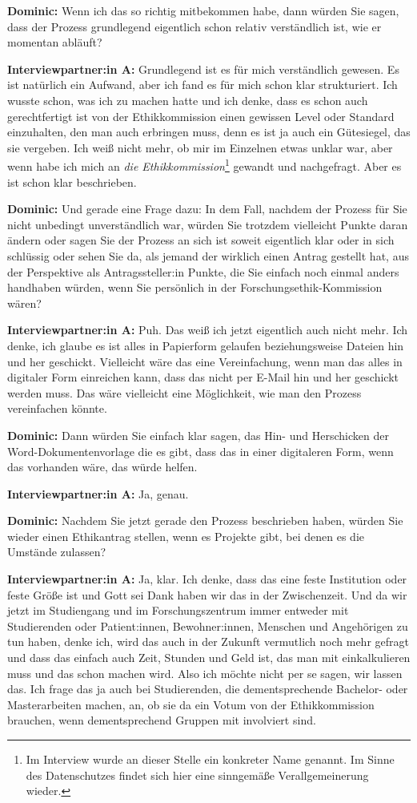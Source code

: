 \documentclass[a4paper,12pt,twoside]{scrreprt}
\begin{document}
\textbf{Dominic:} Wenn ich das so richtig mitbekommen habe, dann würden Sie sagen, dass der Prozess grundlegend eigentlich schon relativ verständlich ist, wie er momentan abläuft?

\textbf{Interviewpartner:in A:} Grundlegend ist es für mich verständlich gewesen. Es ist natürlich ein Aufwand, aber ich fand es für mich schon klar strukturiert. Ich wusste schon, was ich zu machen hatte und ich denke, dass es schon auch gerechtfertigt ist von der Ethikkommission einen gewissen Level oder Standard einzuhalten, den man auch erbringen muss, denn es ist ja auch ein Gütesiegel, das sie vergeben. Ich weiß nicht mehr, ob mir im Einzelnen etwas unklar war, aber wenn habe ich mich an \textit{die Ethikkommission}\footnote{Im Interview wurde an dieser Stelle ein konkreter Name genannt. Im Sinne des Datenschutzes findet sich hier eine sinngemäße Verallgemeinerung wieder.} gewandt und nachgefragt. Aber es ist schon klar beschrieben.

\textbf{Dominic:} Und gerade eine Frage dazu: In dem Fall, nachdem der Prozess für Sie nicht unbedingt unverständlich war, würden Sie trotzdem vielleicht Punkte daran ändern oder sagen Sie der Prozess an sich ist soweit eigentlich klar oder in sich schlüssig oder sehen Sie da, als jemand der wirklich einen Antrag gestellt hat, aus der Perspektive als Antragssteller:in Punkte, die Sie einfach noch einmal anders handhaben würden, wenn Sie persönlich in der Forschungsethik-Kommission wären?

\textbf{Interviewpartner:in A:} Puh. Das weiß ich jetzt eigentlich auch nicht mehr. Ich denke, ich glaube es ist alles in Papierform gelaufen beziehungsweise Dateien hin und her geschickt. Vielleicht wäre das eine Vereinfachung, wenn man das alles in digitaler Form einreichen kann, dass das nicht per E-Mail hin und her geschickt werden muss. Das wäre vielleicht eine Möglichkeit, wie man den Prozess vereinfachen könnte.

\textbf{Dominic:} Dann würden Sie einfach klar sagen, das Hin- und Herschicken der Word-Dokumentenvorlage die es gibt, dass das in einer digitaleren Form, wenn das vorhanden wäre, das würde helfen.

\textbf{Interviewpartner:in A:} Ja, genau.

\textbf{Dominic:} Nachdem Sie jetzt gerade den Prozess beschrieben haben, würden Sie wieder einen Ethikantrag stellen, wenn es Projekte gibt, bei denen es die Umstände zulassen?

\textbf{Interviewpartner:in A:} Ja, klar. Ich denke, dass das eine feste Institution oder feste Größe ist und Gott sei Dank haben wir das in der Zwischenzeit. Und da wir jetzt im Studiengang und im Forschungszentrum immer entweder mit Studierenden oder Patient:innen, Bewohner:innen, Menschen und Angehörigen zu tun haben, denke ich, wird das auch in der Zukunft vermutlich noch mehr gefragt und dass das einfach auch Zeit, Stunden und Geld ist, das man mit einkalkulieren muss und das schon machen wird. Also ich möchte nicht per se sagen, wir lassen das. Ich frage das ja auch bei Studierenden, die dementsprechende Bachelor- oder Masterarbeiten machen, an, ob sie da ein Votum von der Ethikkommission brauchen, wenn dementsprechend Gruppen mit involviert sind.
\end{document}
